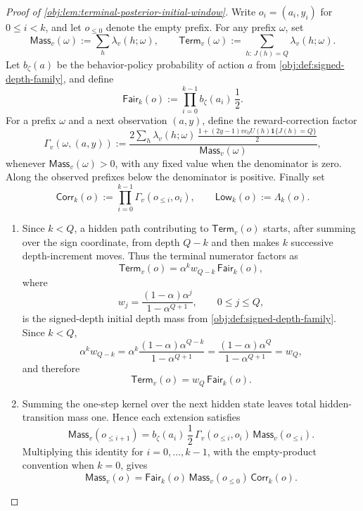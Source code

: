 \documentclass[11pt]{article}
\begin{document}
\begin{proof}[Proof of \cref{obj:lem:terminal-posterior-initial-window}]
Write \(o_i=(a_i,y_i)\) for \(0\le i<k\), and let \(o_{\le 0}\) denote the empty prefix.  For any prefix \(\omega\), set
\[
\mathsf{Mass}_v(\omega):=\sum_h \lambda_v(h;\omega),
\qquad
\mathsf{Term}_v(\omega):=\sum_{h:\,J(h)=Q}\lambda_v(h;\omega).
\]
Let \(b_\zeta(a)\) be the behavior-policy probability of action \(a\) from \cref{obj:def:signed-depth-family}, and define
\[
\mathsf{Fair}_k(o)
:=
\prod_{i=0}^{k-1} b_\zeta(a_i)\,\frac12 .
\]
For a prefix \(\omega\) and a next observation \((a,y)\), define the reward-correction factor
\[
\Gamma_v(\omega,(a,y))
:=
\frac{
  2\sum_h \lambda_v(h;\omega)\,
  \frac{1+(2y-1)v c_0 U(h)\mathbf 1\{J(h)=Q\}}{2}
}{
  \mathsf{Mass}_v(\omega)
},
\]
whenever \(\mathsf{Mass}_v(\omega)>0\), with any fixed value when the denominator is zero.  Along the observed prefixes below the denominator is positive.  Finally set
\[
\mathsf{Corr}_k(o):=\prod_{i=0}^{k-1}\Gamma_v(o_{\le i},o_i),
\qquad
\mathsf{Low}_k(o):=\Lambda_k(o).
\]

\begin{enumerate}
\item Since \(k<Q\), a hidden path contributing to \(\mathsf{Term}_v(o)\) starts, after summing over the sign coordinate, from depth \(Q-k\) and then makes \(k\) successive depth-increment moves.  Thus the terminal numerator factors as
\[
\mathsf{Term}_v(o)
=
\alpha^k w_{Q-k}\,\mathsf{Fair}_k(o),
\]
where
\[
w_j=\frac{(1-\alpha)\alpha^j}{1-\alpha^{Q+1}},
\qquad 0\le j\le Q,
\]
is the signed-depth initial depth mass from \cref{obj:def:signed-depth-family}.  Since \(k<Q\),
\[
\alpha^k w_{Q-k}
=
\alpha^k\frac{(1-\alpha)\alpha^{Q-k}}{1-\alpha^{Q+1}}
=
\frac{(1-\alpha)\alpha^Q}{1-\alpha^{Q+1}}
=
w_Q,
\]
and therefore
\[
\mathsf{Term}_v(o)=w_Q\,\mathsf{Fair}_k(o).
\]

\item Summing the one-step kernel over the next hidden state leaves total hidden-transition mass one.  Hence each extension satisfies
\[
\mathsf{Mass}_v(o_{\le i+1})
=
b_\zeta(a_i)\,\frac12\,
\Gamma_v(o_{\le i},o_i)\,
\mathsf{Mass}_v(o_{\le i}).
\]
Multiplying this identity for \(i=0,\ldots,k-1\), with the empty-product convention when \(k=0\), gives
\[
\mathsf{Mass}_v(o)
=
\mathsf{Fair}_k(o)\,
\mathsf{Mass}_v(o_{\le 0})\,
\mathsf{Corr}_k(o).
\]


\end{enumerate}
\end{proof}
\end{document}
